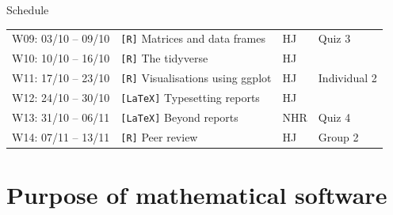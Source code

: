 \documentclass[,aspectratio=169]{beamer}
\begin{document}
\begin{frame}{Schedule}
\begin{tabular}[t]{rlll}
\color{solidpink}\hspace{1em}W09: 03/10 -- 09/10 &\color{solidpink} \texttt{[R]} Matrices and data frames & \color{solidpink}HJ & Quiz 3\\

\color{solidpink}\hspace{1em}W10: 10/10 -- 16/10 &\color{solidpink} \texttt{[R]} The tidyverse &\color{solidpink} HJ & \\

\color{solidpink}\hspace{1em}W11: 17/10 -- 23/10 & \color{solidpink}\texttt{[R]} Visualisations using ggplot &\color{solidpink} HJ & Individual 2\\

\color{myrtlegreen}\hspace{1em}W12: 24/10 -- 30/10 & \color{myrtlegreen}\texttt{[LaTeX]} Typesetting reports & \color{myrtlegreen}HJ & \\

\color{myrtlegreen}\hspace{1em}W13: 31/10 -- 06/11 & \color{myrtlegreen}\texttt{[LaTeX]} \color{myrtlegreen}Beyond reports &\color{myrtlegreen} NHR & Quiz 4\\

\color{solidpink}\hspace{1em}W14: 07/11 -- 13/11 & \color{solidpink}\texttt{[R]} Peer review & \color{solidpink}HJ & Group 2\\
\bottomrule
\end{tabular}
\end{frame}

\hypertarget{purpose-of-mathematical-software}{%
\section{Purpose of mathematical
software}\label{purpose-of-mathematical-software}}
\end{document}
